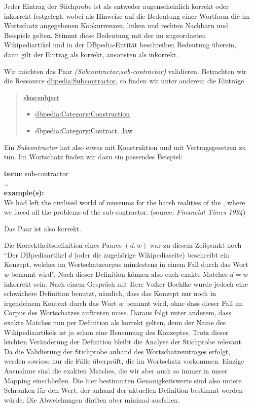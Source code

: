 Jeder Eintrag der Stichprobe ist als entweder augenscheinlich korrekt oder inkorrekt festgelegt,
wobei als Hinweise auf die Bedeutung einer Wortform die im Wortschatz angegebenen Kookurrenzen, linken und rechten Nachbarn und Beispiele gelten.
Stimmt diese Bedeutung mit der im zugeordneten Wikipediartikel und in der DBpedia-Entität beschreiben Bedeutung überein, dann gilt der Eintrag als korrekt, ansonsten als inkorrekt.


\begin{bsp}
Wir möchten das Paar \emph{(Subcontractor,sub-contractor)} validieren.
Betrachten wir die Ressource \url{dbpedia:Subcontractor}, so finden wir unter anderem die Einträge
\begin{quote}
\url{skos:subject}
\begin{itemize}
\item \url{dbpedia:Category:Construction}
\item \url{dbpedia:Category:Contract_law}
\end{itemize}
\end{quote}

Ein \emph{Subcontractor} hat also etwas mit Konstruktion und mit Vertragsgesetzen zu tun.
Im Wortschatz finden wir dazu ein passendes Beispiel:
\begin{webseitenausschnitt}
\textbf{term}: sub-contractor\\
\ldots\\
\textbf{example(s):}\\
We had left the civilised world of museums for the harsh realities of the , where we faced all the problems of the sub-contractor. (source: \emph{Financial Times 1994})
\end{webseitenausschnitt}
Das Paar ist also korrekt.
\end{bsp}
\iffalse
\begin{rem}
Die Korrektheitsdefinition eines Paares $(d,w)$ war zu diesem Zeitpunkt noch 
"`Der DBpediaartikel $d$ (oder die zugehörige Wikipediaseite) beschreibt ein Konzept, welches im Wortschatzcorpus mindestens in einem Fall durch das Wort $w$ benannt wird"'.
Nach dieser Definition können also euch exakte Matches $d=w$ inkorrekt sein.
Nach einem Gespräch mit Herr Volker Boehlke wurde jedoch eine schwächere Definition benutzt, nämlich, dass das Konzept nur noch in irgendeinem Kontext durch das Wort $w$ benannt wird,
 ohne dass dieser Fall im Corpus des Wortschatzes auftreten muss.
Daraus folgt unter anderem, dass exakte Matches nun per Definition als korrekt gelten, denn der Name des Wikipediaartikels ist ja schon eine Benennung des Konzeptes.
Trotz dieser leichten Veränderung der Definition bleibt die Analyse der Stichprobe relevant.
Da die Validierung der Stichprobe anhand des Wortschatzeintrages erfolgt, werden sowieso nur die Fälle überprüft, die im Wortschatz vorkommen.
Einzige Ausnahme sind die exakten Matches, die wir aber auch so immer in unser Mapping einschließen.
Die hier bestimmten Genauigkeitswerte sind also untere Schranken für den Wert, der anhand der aktuellen Definition bestimmt werden würde. Die Abweichungen dürften aber minimal ausfallen.
\end{rem}
